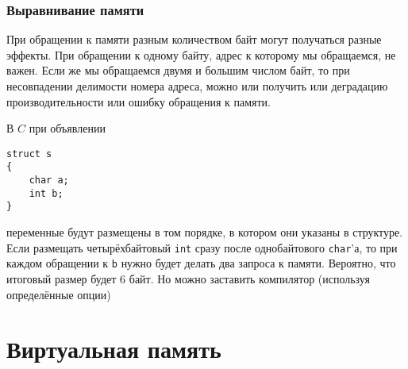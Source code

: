 \subsubsection{Выравнивание памяти}
При обращении к памяти разным количеством байт могут получаться разные эффекты. При обращении к одному байту, адрес к которому мы обращаемся, не важен. Если же мы обращаемся двумя и большим числом байт, то при несовпадении делимости номера адреса, можно или получить или деградацию производительности или ошибку обращения к памяти.

В $C$ при объявлении

\begin{verbatim}
struct s
{
    char a;
    int b;
}
\end{verbatim}
переменные будут размещены в том порядке, в котором они указаны в структуре. Если размещать четырёхбайтовый \verb!int! сразу после однобайтового \verb!char!'а, то при каждом обращении к \verb!b! нужно будет делать два запроса к памяти. Вероятно, что итоговый размер будет 6 байт. Но можно заставить компилятор (используя определённые опции)

\section{Виртуальная память}

